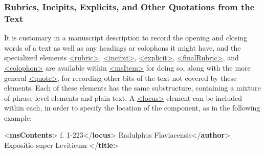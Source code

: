 \subsubsection[{Rubrics, Incipits, Explicits, and Other Quotations from the Text}]{Rubrics, Incipits, Explicits, and Other Quotations from the Text}\label{mscorie}\par
It is customary in a manuscript description to record the opening and closing words of a text as well as any headings or colophons it might have, and the specialized elements \hyperref[TEI.rubric]{<rubric>}, \hyperref[TEI.incipit]{<incipit>}, \hyperref[TEI.explicit]{<explicit>}, \hyperref[TEI.finalRubric]{<finalRubric>}, and \hyperref[TEI.colophon]{<colophon>} are available within \hyperref[TEI.msItem]{<msItem>} for doing so, along with the more general \hyperref[TEI.quote]{<quote>}, for recording other bits of the text not covered by these elements. Each of these elements has the same substructure, containing a mixture of phrase-level elements and plain text. A \hyperref[TEI.locus]{<locus>} element can be included within each, in order to specify the location of the component, as in the following example: \par\bgroup{}\exampleFont \begin{shaded}\noindent\mbox{}{<\textbf{msContents}>}\mbox{}\newline 
{}\mbox{}\newline 
\hspace*{1em}f. 1-223{</\textbf{locus}>}\mbox{}\newline 
\hspace*{1em}Radulphus Flaviacensis{</\textbf{author}>}\mbox{}\newline 
\hspace*{1em}Expositio super Leviticum {</\textbf{title}>}\mbox{}\newline 
\hspace*{1em}\mbox{}\newline 

\end{shaded}
